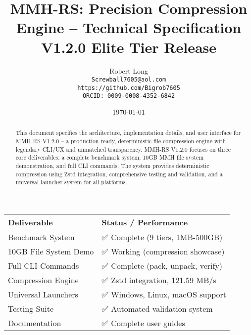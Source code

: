 \documentclass[11pt,a4paper]{article}
\title{MMH-RS: Precision Compression Engine -- Technical Specification\\[1ex]\textbf{\large V1.2.0 Elite Tier Release}}
\author{Robert Long \\ \texttt{Screwball7605@aol.com} \\ \texttt{https://github.com/Bigrob7605} \\ \texttt{ORCID: 0009-0008-4352-6842}}
\date{\today}
\begin{document}
	\maketitle
	\thispagestyle{empty}
	\begin{abstract}
		This document specifies the architecture, implementation details, and user interface for MMH-RS V1.2.0 -- a production-ready, deterministic file compression engine with legendary CLI/UX and unmatched transparency. MMH-RS V1.2.0 focuses on three core deliverables: a complete benchmark system, 10GB MMH file system demonstration, and full CLI commands. The system provides deterministic compression using Zstd integration, comprehensive testing and validation, and a universal launcher system for all platforms.
	\end{abstract}

	\begin{center}
	\begin{tcolorbox}[colback=gray!5, colframe=gray!60, boxrule=0.7pt, arc=2pt, title=\textbf{\large MMH-RS V1.2.0 Core Deliverables}]
	\begin{tabular}{@{}ll@{}}
	\toprule
	\textbf{Deliverable} & \textbf{Status / Performance} \\
	\midrule
	Benchmark System     & ✅ Complete (9 tiers, 1MB-500GB) \\
	10GB File System Demo & ✅ Working (compression showcase) \\
	Full CLI Commands    & ✅ Complete (pack, unpack, verify) \\
	Compression Engine   & ✅ Zstd integration, 121.59 MB/s \\
	Universal Launchers  & ✅ Windows, Linux, macOS support \\
	Testing Suite        & ✅ Automated validation system \\
	Documentation        & ✅ Complete user guides \\
	\bottomrule
	\end{tabular}
	\end{tcolorbox}
	\end{center}
\end{document}
